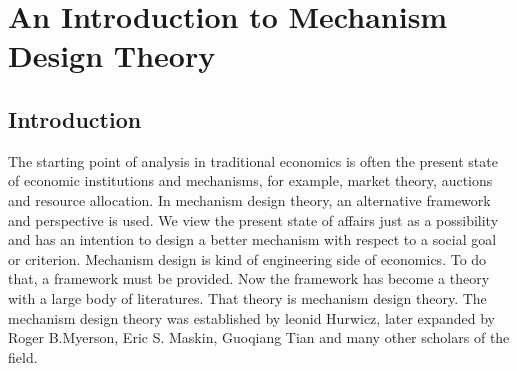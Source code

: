 

\chapter{An Introduction to Mechanism Design Theory} %

\label{Chapter1} %


\newcommand{\keyword}[1]{\textbf{#1}}
\newcommand{\tabhead}[1]{\textbf{#1}}
\newcommand{\code}[1]{\texttt{#1}}
\newcommand{\file}[1]{\texttt{\bfseries#1}}
\newcommand{\option}[1]{\texttt{\itshape#1}}

\newtheorem{definition}{Definition}
\newtheorem*{definition*}{Definition}
\newtheorem{thm}{Theorem}
\newtheorem*{thm*}{Theorem}
\newtheorem{example}{Example}
\newtheorem*{example*}{Example}
\newtheorem{lemma}{Lemma}
\newtheorem*{lemma*}{Lemma}
\newtheorem{prop}{Proposition}
\newtheorem*{prop*}{Proposition}
\newtheorem{assumption}{Assumption}
\newtheorem*{assumption*}{Assumption}
\newtheorem{corollary}{Corollary}
\newtheorem*{corollary*}{Corollary}
\newtheorem{conjecture}{conjecture}
\newtheorem*{conjecture*}{conjecture}
\newtheorem*{remark}{Remark}





 





\section{Introduction}

The starting point of analysis in traditional economics is often the
present state of economic institutions and mechanisms, for example,
market theory, auctions and resource allocation. In mechanism design
theory, an alternative framework and perspective is used. We view the
present state of affairs just as a possibility and has an intention to
design a better mechanism with respect to a social goal or
criterion. Mechanism design is kind of engineering side of
economics. To do that, a framework must be provided. Now the framework
has become a theory with a large body of literatures. That theory is
mechanism design theory. The mechanism design theory was established
by leonid Hurwicz, later expanded by Roger B.Myerson, Eric S. Maskin,
Guoqiang Tian and many other scholars of the field.

